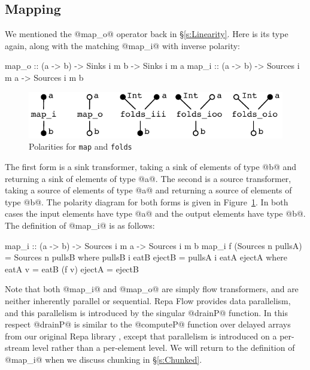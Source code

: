 \subsection{Mapping}
\label{s:Mapping}
We mentioned the @map_o@ operator back in \S\ref{s:Linearity}. Here is its type again, along with the matching @map_i@ with inverse polarity:

\begin{code}
map_o :: (a -> b) -> Sinks   i m b -> Sinks   i m a
map_i :: (a -> b) -> Sources i m a -> Sources i m b
\end{code}

\begin{figure}
\begin{center}
\includegraphics[scale=0.8]{figures/maps.pdf}
\end{center}
\vspace{-0.5em}
\caption{Polarities for \texttt{map} and \texttt{folds}}
\label{f:Map}
\end{figure}

The first form is a sink transformer, taking a sink of elements of type @b@ and returning a sink of elements of type @a@. The second is a source transformer, taking a source of elements of type @a@ and returning a source of elements of type @b@. The polarity diagram for both forms is given in Figure~\ref{f:Map}. In both cases the input elements have type @a@ and the output elements have type @b@. The definition of @map_i@ is as follows:
\begin{code}
map_i :: (a -> b) -> Sources i m a -> Sources i m b
map_i f (Sources n pullsA)
 = Sources n pullsB
 where  pullsB i eatB ejectB
         = pullsA i eatA ejectA
         where  eatA v = eatB (f v)
                ejectA = ejectB
\end{code}

Note that both @map_i@ and @map_o@ are simply flow transformers, and are neither inherently parallel or sequential. Repa Flow provides data parallelism, and this parallelism is introduced by the singular @drainP@ function. In this respect @drainP@ is similar to the @computeP@ function over delayed arrays from our original Repa library \cite{Lippmeier:Guiding}, except that parallelism is introduced on a per-stream level rather than a per-element level. We will return to the definition of @map_i@ when we discuss chunking in \S\ref{s:Chunked}.


